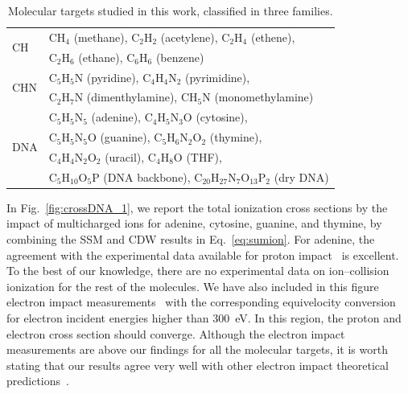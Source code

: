 \documentclass[preprint,showpacs]{revtex4}
\begin{document}
\begin{table}[H]
\begin{center}
\begin{tabular}{|p{}|p{}|}
\hline
\multirow{2}{*}{CH} 
      & CH$_4$ (methane), C$_2$H$_2$ (acetylene), C$_2$H$_4$ (ethene), \\
      & C$_2$H$_6$ (ethane), C$_6$H$_6$ (benzene) \\
\hline
\multirow{2}{*}{CHN} 
      & C$_5$H$_5$N (pyridine), C$_4$H$_4$N$_2$ (pyrimidine), \\ 
      & C$_2$H$_7$N (dimenthylamine), CH$_5$N (monomethylamine) \\
\hline
\multirow{4}{*}{DNA} 
      & C$_5$H$_5$N$_5$ (adenine), C$_4$H$_5$N$_3$O (cytosine), \\
      & C$_5$H$_5$N$_5$O (guanine), C$_5$H$_6$N$_2$O$_2$ (thymine), \\
      & C$_4$H$_4$N$_2$O$_2$ (uracil), C$_4$H$_8$O (THF), \\
      & C$_5$H$_{10}$O$_5$P (DNA backbone), 
        C$_{20}$H$_{27}$N$_7$O$_{13}$P$_2$ 
(dry DNA) \\
\hline
\end{tabular}
\caption{Molecular targets studied in this work, classified in three 
families.}
\label{tab:families}
\end{center}
\end{table}

In Fig.~\ref{fig:crossDNA_1}, we report the total ionization cross 
sections by the impact of multicharged ions for adenine, cytosine, 
guanine, and thymine, by combining the SSM and CDW results in 
Eq.~\ref{eq:sumion}. For adenine, the agreement with the experimental 
data available for proton impact~\cite{iriki2011} is excellent. To the 
best of our knowledge, there are no experimental data on ion--collision 
ionization for the rest of the molecules. We have also included in this 
figure electron impact measurements~\cite{rahman2016} with the 
corresponding equivelocity conversion for electron incident energies 
higher than 300~eV. In this region, the proton and electron cross 
section should converge. Although the electron impact measurements are 
above our findings for all the molecular targets, it is worth stating 
that our results agree very well with other electron impact theoretical 
predictions~\cite{mozejko2003,tan2018}. 
\end{document}
